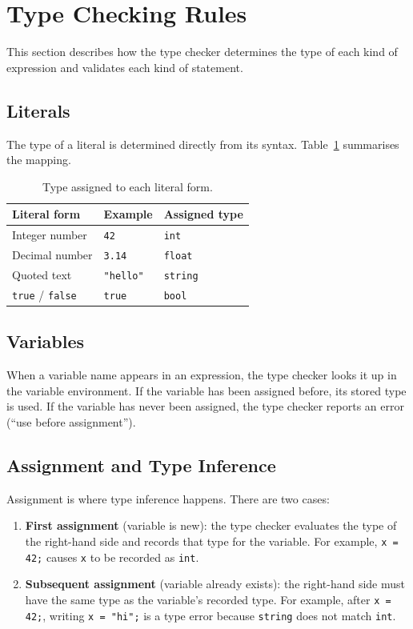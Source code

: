 \documentclass[12pt,a4paper]{report}
\newcommand{\tint}{\texttt{int}}
\newcommand{\tfloat}{\texttt{float}}
\newcommand{\tbool}{\texttt{bool}}
\newcommand{\tstring}{\texttt{string}}
\begin{document}
\section{Type Checking Rules}
 
This section describes how the type checker determines the type of each
kind of expression and validates each kind of statement.
 
\subsection{Literals}
 
The type of a literal is determined directly from its syntax.
Table~\ref{tab:literal-types} summarises the mapping.
 
\begin{table}[H]
\centering
\caption{Type assigned to each literal form.}
\label{tab:literal-types}
\begin{tabular}{@{} l l l @{}}
\toprule
\textbf{Literal form} & \textbf{Example} & \textbf{Assigned type} \\
\midrule
Integer number   & \texttt{42}      & \tint    \\
Decimal number   & \texttt{3.14}    & \tfloat  \\
Quoted text      & \texttt{"hello"} & \tstring \\
\texttt{true} / \texttt{false} & \texttt{true} & \tbool \\
\bottomrule
\end{tabular}
\end{table}
 
\subsection{Variables}
 
When a variable name appears in an expression, the type checker looks it up
in the variable environment. If the variable has been assigned before, its
stored type is used. If the variable has never been assigned, the type
checker reports an error (``use before assignment'').
 
\subsection{Assignment and Type Inference}
 
Assignment is where type inference happens. There are two cases:
 
\begin{enumerate}
  \item \textbf{First assignment} (variable is new): the type checker
        evaluates the type of the right-hand side and records that type for
        the variable. For example, \texttt{x = 42;} causes \texttt{x} to be
        recorded as \tint.
  \item \textbf{Subsequent assignment} (variable already exists): the
        right-hand side must have the same type as the variable's recorded
        type. For example, after \texttt{x = 42;}, writing \texttt{x = "hi";}
        is a type error because \tstring{} does not match \tint.
\end{enumerate}
 
\end{document}

